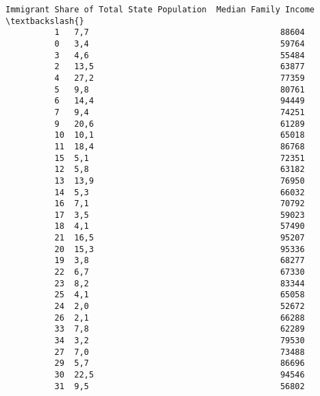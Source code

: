 \documentclass[11pt]{article}
\begin{document}
\begin{Verbatim}[commandchars=\\\{\}]
             Immigrant Share of Total State Population  Median Family Income  \textbackslash{}
          1   7,7                                       88604                  
          0   3,4                                       59764                  
          3   4,6                                       55484                  
          2   13,5                                      63877                  
          4   27,2                                      77359                  
          5   9,8                                       80761                  
          6   14,4                                      94449                  
          7   9,4                                       74251                  
          9   20,6                                      61289                  
          10  10,1                                      65018                  
          11  18,4                                      86768                  
          15  5,1                                       72351                  
          12  5,8                                       63182                  
          13  13,9                                      76950                  
          14  5,3                                       66032                  
          16  7,1                                       70792                  
          17  3,5                                       59023                  
          18  4,1                                       57490                  
          21  16,5                                      95207                  
          20  15,3                                      95336                  
          19  3,8                                       68277                  
          22  6,7                                       67330                  
          23  8,2                                       83344                  
          25  4,1                                       65058                  
          24  2,0                                       52672                  
          26  2,1                                       66288                  
          33  7,8                                       62289                  
          34  3,2                                       79530                  
          27  7,0                                       73488                  
          29  5,7                                       86696                  
          30  22,5                                      94546                  
          31  9,5                                       56802                  

\end{Verbatim}
\end{document}
